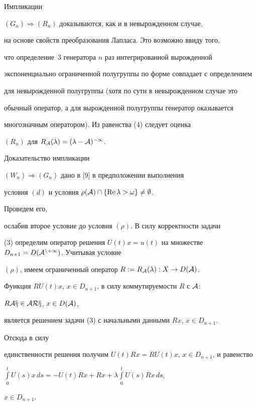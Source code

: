 \begin{pf}


Импликации


$(G_n)\Longrightarrow(R_n)$ доказываются, как и в невырожденном случае, 


на основе свойств преобразования Лапласа. Это возможно ввиду того, 


что определение~3 генератора $n$ раз интегрированной вырожденной 


экспоненциально ограниченной полугруппы по форме совпадает с определением 


для невырожденной полугруппы (хотя по сути в невырожденном случае это 


обычный оператор, а для вырожденной полугруппы генератор оказывается 


многозначным оператором). Из равенства (4) следует оценка 


$(R_n)$ для $R_{\cal A}(\lambda)=(\lambda-\cal A)^{-1}$. 


 


 


Доказательство импликации 


$(W_n)\Longrightarrow(G_n)$ дано в [9] в предположении выполнения 


условия $(d)$ и условия $\rho(\cal A)\cap\{\operatorname{Re}\lambda>\omega\}\ne\emptyset$. 


Проведем его, 


ослабив второе условие до условия $(\rho)$. В силу корректности задачи 


(3) определим оператор решения $U(t)x=u(t)$ на множестве $D_{n+1}=D(\cal 


A^{n+1})$. Учитывая условие 


$(\rho)$, имеем ограниченный оператор $R:=R_{\cal A}(\lambda):X\to D(\cal 


A)$. 


Функция $RU(t)x$, $x\in D_{n+1}$, в силу коммутируемости $R$ с $\cal A$: 


$R\cal A x\in\cal A Rx$, $x\in D(\cal A)$, 


является решением задачи (3) с начальными данными $Rx$, $x\in D_{n+1}$. 


Отсюда в силу 


единственности решения получим $U(t)Rx=RU(t)x$, $x\in D_{n+1}$, и равенство 


$\int\limits^t_0 U(s)x\,ds=-U(t)Rx+Rx+\lambda\int\limits^t_0 U(s)Rx\,ds$, 


$x\in D_{n+1}$. 



\end{pf}
